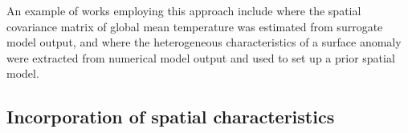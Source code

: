 \documentclass[10pt,a4paper]{article}
\begin{document}
%

An example of works employing this approach include \cite{Berliner_2000} where the spatial covariance matrix of global mean temperature was estimated from surrogate model output, and \cite{Zammit_2013} where the heterogeneous characteristics of a surface anomaly were extracted from numerical model output and used to set up a prior spatial model.

\subsection{Incorporation of spatial characteristics}
\end{document}
